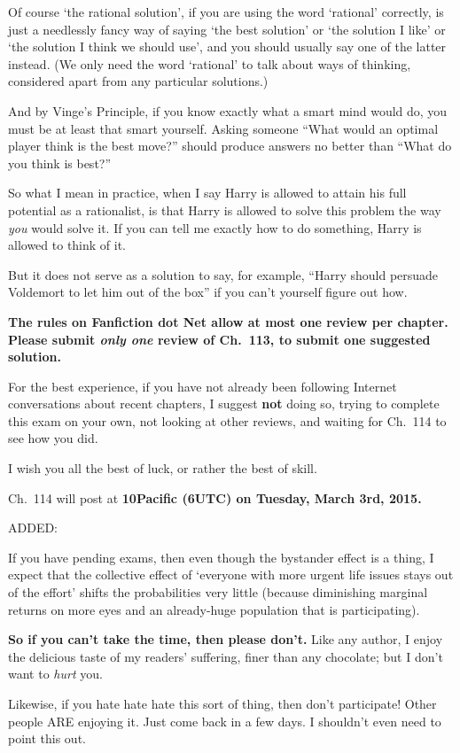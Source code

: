 {{Of course ‘the rational solution’, if you are using the word ‘rational’ correctly, is just a needlessly fancy way of saying ‘the best solution’ or ‘the solution I like’ or ‘the solution I think we should use’, and you should usually say one of the latter instead. (We only need the word ‘rational’ to talk about ways of thinking, considered apart from any particular solutions.)

And by Vinge’s Principle, if you know exactly what a smart mind would do, you must be at least that smart yourself. Asking someone “What would an optimal player think is the best move?” should produce answers no better than “What do you think is best?”

So what I mean in practice, when I say Harry is allowed to attain his full potential as a
rationalist, is that Harry is allowed to solve this problem the way \emph{you} would solve it. If you can tell me exactly how to do something, Harry is allowed to think of it.

But it does not serve as a solution to say, for example, “Harry should persuade Voldemort to let him out of the box” if you can’t yourself figure out how.

\textbf{The rules on Fanfiction dot Net allow at most one review per chapter. Please submit \emph{only one} review of Ch.~113, to submit one suggested solution.}

For the best experience, if you have not already been following Internet conversations about recent chapters, I suggest \textbf{not} doing so, trying to complete this exam on your own, not looking at other reviews, and waiting for Ch.~114 to see how you did.

I wish you all the best of luck, or rather the best of skill.

Ch.~114 will post at \textbf{10\AM Pacific (6\PM UTC) on Tuesday, March 3rd, 2015.}

ADDED:

If you have pending exams, then even though the bystander effect is a thing,
I expect that the collective effect of ‘everyone with more urgent life issues stays out of the effort’ shifts the probabilities very little (because diminishing marginal returns on more eyes and an already-huge population that is participating).

\textbf{So if you can’t take the time, then please don’t.} Like any author, I enjoy the delicious taste of my readers’ suffering, finer than any chocolate; but I don’t want to \emph{hurt} you.

Likewise, if you hate hate hate this sort of thing, then don’t participate! Other people ARE enjoying it. Just come back in a few days. I shouldn’t even need to point this out.

}}

